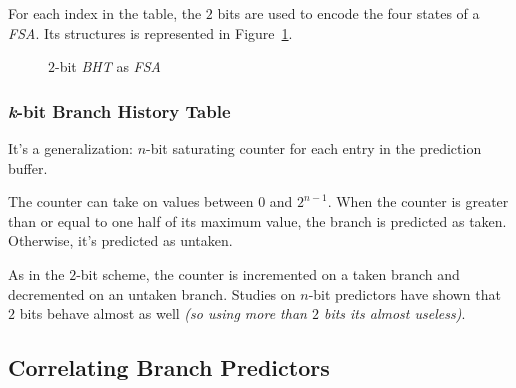 \documentclass[english]{article}
\begin{document}
For each index in the table, the \(2\) bits are used to encode the four states of a \textit{FSA}.
Its structures is represented in Figure~\ref{fig:2-bit-BHT-as-FSA}.

\begin{figure}[htbp]
  \bigskip
  \centering


  \caption{\(2\)-bit \textit{BHT} as \textit{FSA}}
  \label{fig:2-bit-BHT-as-FSA}
  \bigskip
\end{figure}

\subsubsection{\textit{k}-bit Branch History Table}

It's a generalization: \(n\)-bit saturating counter for each entry in the prediction buffer.

The counter can take on values between \(0\) and \(2^{n-1}\).
When the counter is greater than or equal to one half of its maximum value, the branch is predicted as taken.
Otherwise, it's predicted as untaken.

As in the \(2\)-bit scheme, the counter is incremented on a taken branch and decremented on an untaken branch.
Studies on \(n\)-bit predictors have shown that \(2\) bits behave almost as well \textit{(so using more than \(2\) bits its almost useless)}.

\subsection{Correlating Branch Predictors}
\end{document}

